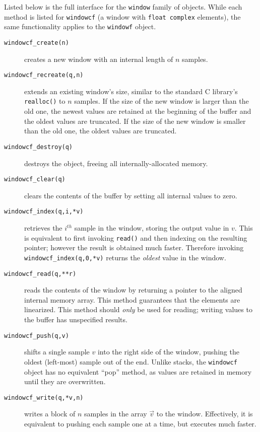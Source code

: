 Listed below is the full interface for the {\tt window} family of
objects.
While each method is listed for {\tt windowcf}
(a window with {\tt float complex} elements),
the same functionality applies to the {\tt windowf} object.
%
\begin{description}
\item[{\tt windowcf\_create(n)}]
    creates a new window with an internal length of $n$ samples.
\item[{\tt windowcf\_recreate(q,n)}]
    extends an existing window's size, similar to the standard C library's
    {\tt realloc()} to $n$ samples.
    If the size of the new window is larger than the old one, the newest
    values are retained at the beginning of the buffer and the oldest
    values are truncated.
    If the size of the new window is smaller than the old one, the
    oldest values are truncated.
\item[{\tt windowcf\_destroy(q)}]
    destroys the object, freeing all internally-allocated memory.
\item[{\tt windowcf\_clear(q)}]
    clears the contents of the buffer by setting all internal values to zero.
\item[{\tt windowcf\_index(q,i,*v)}]
    retrieves the $i^{th}$ sample in the window, storing the output
    value in $v$.
    This is equivalent to first invoking {\tt read()} and then indexing
    on the resulting pointer;
    however the result is obtained much faster.
    Therefore invoking {\tt windowcf\_index(q,0,*v)} returns the
    {\em oldest} value in the window.
\item[{\tt windowcf\_read(q,**r)}]
    reads the contents of the window by returning a pointer to the
    aligned internal memory array.
    This method guarantees that the elements are linearized.
    This method should {\em only} be used for reading; writing values to
    the buffer has unspecified results.
\item[{\tt windowcf\_push(q,v)}]
    shifts a single sample $v$ into the right side of the window,
    pushing the oldest (left-most) sample out of the end.
    Unlike stacks, the {\tt windowcf} object has no equivalent ``pop''
    method, as values are retained in memory until they are overwritten.
\item[{\tt windowcf\_write(q,*v,n)}]
    writes a block of $n$ samples in the array $\vec{v}$ to the window.
    Effectively, it is equivalent to pushing each sample one at a time,
    but executes much faster.
\end{description}

